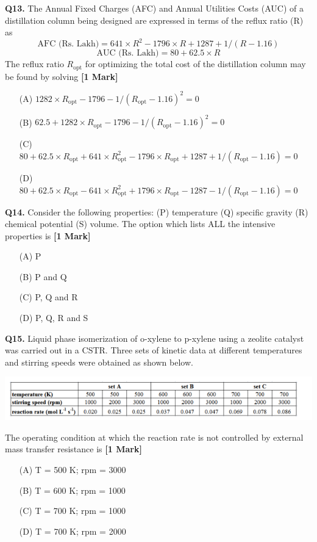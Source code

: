 \documentclass[11pt]{article}
\newcommand{\questiona}[2]{
    \noindent\textbf{Q#2.} #1 \hfill \textbf{[1 Mark]}
}
\begin{document}
\questiona{The Annual Fixed Charges (AFC) and Annual Utilities Costs (AUC) of a distillation column being designed are expressed in terms of the reflux ratio (R) as
\[ \text{AFC (Rs. Lakh)} = 641 \times R^2 - 1796 \times R + 1287 + 1/(R - 1.16) \]
\[ \text{AUC (Rs. Lakh)} = 80 + 62.5 \times R \]
The reflux ratio \( R_{\text{opt}} \) for optimizing the total cost of the distillation column may be found by solving}{13}
\begin{enumerate}
    \item[(A)] \( 1282 \times R_{\text{opt}} - 1796 - 1/(R_{\text{opt}} - 1.16)^2 = 0 \)  
    \item[(B)] \( 62.5 + 1282 \times R_{\text{opt}} - 1796 - 1/(R_{\text{opt}} - 1.16)^2 = 0 \)  
    \item[(C)] \( 80 + 62.5 \times R_{\text{opt}} + 641 \times R_{\text{opt}}^2 - 1796 \times R_{\text{opt}} + 1287 + 1/(R_{\text{opt}} - 1.16) = 0 \)  
    \item[(D)] \( 80 + 62.5 \times R_{\text{opt}} - 641 \times R_{\text{opt}}^2 + 1796 \times R_{\text{opt}} - 1287 - 1/(R_{\text{opt}} - 1.16) = 0 \)  
\end{enumerate}

\questiona{Consider the following properties: (P) temperature (Q) specific gravity (R) chemical potential (S) volume. The option which lists ALL the intensive properties is}{14}
\begin{enumerate}
    \item[(A)] P  
    \item[(B)] P and Q  
    \item[(C)] P, Q and R  
    \item[(D)] P, Q, R and S  
\end{enumerate}

\questiona{Liquid phase isomerization of o-xylene to p-xylene using a zeolite catalyst was carried out in a CSTR. Three sets of kinetic data at different temperatures and stirring speeds were obtained as shown below.
\begin{center}
\includegraphics[width=1\textwidth]{figures/Q15.png}
\end{center}
The operating condition at which the reaction rate is not controlled by external mass transfer resistance is}{15}
\begin{enumerate}
    \item[(A)] T = 500 K; rpm = 3000  
    \item[(B)] T = 600 K; rpm = 1000  
    \item[(C)] T = 700 K; rpm = 1000  
    \item[(D)] T = 700 K; rpm = 2000  
\end{enumerate}
\end{document}
